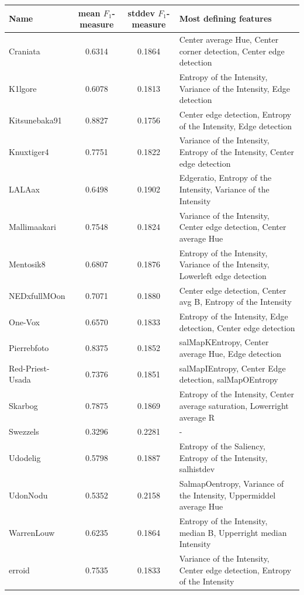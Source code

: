 \begin{table}[htb]
    \centering
    \begin{tabular}
        { | l | c | c | l | } 
        \hline
        Name & mean $F_1$-measure & stddev $F_1$-measure & Most defining features\\
        \hline
    Craniata &  0.6314 & 0.1864 & Center average Hue, Center corner detection, Center edge detection\\
    K1lgore & 0.6078 & 0.1813 & Entropy of the Intensity, Variance of the Intensity, Edge detection \\
    Kitsunebaka91 & 0.8827 & 0.1756 & Center edge detection, Entropy of the Intensity, Edge detection \\
    Knuxtiger4 & 0.7751 & 0.1822 & Variance of the Intensity, Entropy of the Intensity, Center edge detection \\
    LALAax & 0.6498 & 0.1902 & Edgeratio, Entropy of the Intensity, Variance of the Intensity \\
    Mallimaakari & 0.7548 & 0.1824 & Variance of the Intensity, Center edge detection, Center average Hue\\
    Mentosik8 & 0.6807 & 0.1876 & Entropy of the Intensity, Variance of the Intensity, Lowerleft edge detection \\ 
    NEDxfullMOon & 0.7071 & 0.1880 & Center edge detection, Center avg B, Entropy of the Intensity\\
    One-Vox & 0.6570 & 0.1833 & Entropy of the Intensity, Edge detection, Center edge detection  \\
    Pierrebfoto & 0.8375 & 0.1852 & salMapKEntropy, Center average Hue, Edge detection\\
    Red-Priest-Usada & 0.7376 & 0.1851 & salMapIEntropy, Center Edge detection, salMapOEntropy\\
    Skarbog & 0.7875 & 0.1869 & Entropy of the Intensity, Center average saturation, Lowerright average R \\
    Swezzels & 0.3296 & 0.2281 & - \\ 
    Udodelig & 0.5798 & 0.1887 & Entropy of the Saliency, Entropy of the Intensity, salhistdev \\
    UdonNodu & 0.5352 & 0.2158 & SalmapOentropy, Variance of the Intensity, Uppermiddel average Hue \\ 
    WarrenLouw & 0.6235 & 0.1864 & Entropy of the Intensity, median B, Upperright median Intensity\\
    erroid & 0.7535 & 0.1833 & Variance of the Intensity, Center edge detection, Entropy of the Intensity\\

\end{tabular}
\end{table}
